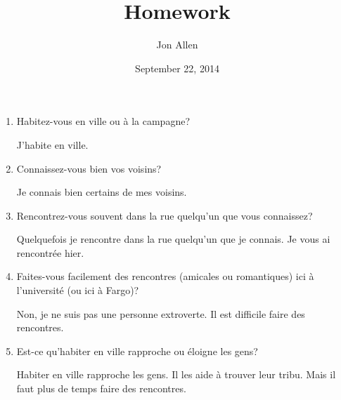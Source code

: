 \documentclass[letterpaper]{article}
\begin{document}
\title{Homework}
\date{September 22, 2014}
\author{Jon Allen}
\maketitle
\begin{enumerate}
\item
Habitez-vous en ville ou à la campagne?

J'habite en ville.
\item
Connaissez-vous bien vos voisins?

Je connais bien certains de mes voisins.
\item
Rencontrez-vous souvent dans la rue quelqu'un que vous connaissez?

Quelquefois je rencontre dans la rue quelqu'un que je connais. Je vous ai rencontrée hier.
\item
Faites-vous facilement des rencontres (amicales ou romantiques) ici à l'université (ou ici à Fargo)?

Non, je ne suis pas une personne extroverte. Il est difficile faire des rencontres.
\item
Est-ce qu'habiter en ville rapproche ou éloigne les gens?

Habiter en ville rapproche les gens. Il les aide à trouver leur tribu. Mais il faut plus de temps faire des rencontres.
\end{enumerate}
\end{document}
